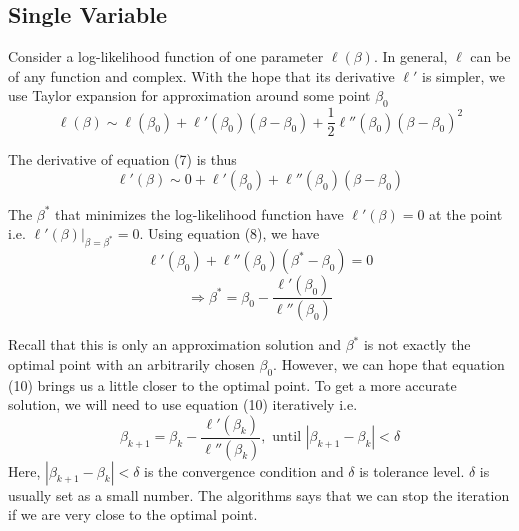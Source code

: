 \documentclass[12pt, oneside]{article}
\begin{document}
\subsection{Single Variable}
Consider a log-likelihood function of one parameter ${\ell(\beta)}$. In general, $\ell$ can be of any function and complex. With the hope that its derivative $\ell'$ is simpler, we use Taylor expansion for approximation around some point $\beta_0$
\begin{equation}
\ell(\beta)\sim\ell(\beta_0)+\ell'(\beta_0)(\beta-\beta_0)+\frac{1}{2}\ell''(\beta_0)(\beta-\beta_0)^2
\end{equation}

The derivative of equation (7) is thus
\begin{equation}
\ell'(\beta)\sim0+\ell'(\beta_0)+\ell''(\beta_0)(\beta-\beta_0)
\end{equation}


The $\beta^*$ that minimizes the log-likelihood function have $\ell'(\beta)=0$ at the point i.e. ${\ell'(\beta)|_{\beta=\beta^*}=0}$. Using equation (8), we have
\begin{equation}
\ell'(\beta_0)+\ell''(\beta_0)(\beta^*-\beta_0)=0
\end{equation}
\begin{equation}
\Rightarrow\beta^*=\beta_0-\frac{\ell'(\beta_0)}{\ell''(\beta_0)}
\end{equation}

Recall that this is only an approximation solution and $\beta^*$ is not exactly the optimal point with an arbitrarily chosen $\beta_0$. However, we can hope that equation (10) brings us a little closer to the optimal point. To get a more accurate solution, we will need to use equation (10) iteratively i.e.
$$
\beta_{k+1}=\beta_k-\frac{\ell'(\beta_k)}{\ell''(\beta_k)}, \text { until } |\beta_{k+1}-\beta_{k}|<\delta
$$
Here, $|\beta_{k+1}-\beta_{k}|<\delta$ is the convergence condition and $\delta$ is tolerance level. $\delta$ is usually set as a small number. The algorithms says that we can stop the iteration if we are very close to the optimal point.
\end{document}
